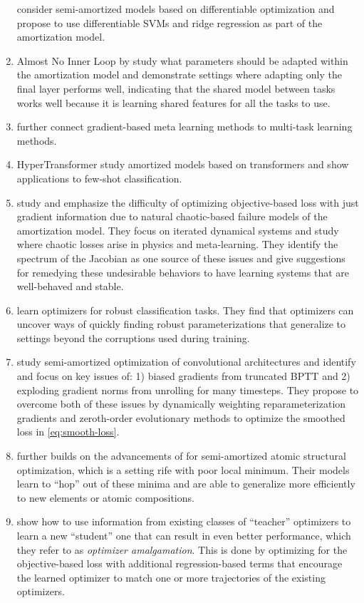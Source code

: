 \documentclass[twoside,11pt]{article}
\begin{document}
\begin{enumerate}
  consider semi-amortized models based on differentiable
  optimization and propose to use differentiable SVMs
  and ridge regression as part of the amortization model.
\item Almost No Inner Loop by \citet{raghu2019rapid}
  study what parameters should be adapted within the amortization
  model and demonstrate settings where adapting only
  the final layer performs well, indicating that the shared model
  between tasks works well because it is learning
  shared features for all the tasks to use.
\item \citet{wang2021bridging} further connect gradient-based meta
  learning methods to multi-task learning methods.
\item HyperTransformer \citep{zhmoginov2022hypertransformer}
  study amortized models based on transformers
  \citep{vaswani2017attention}
  and show applications to few-shot classification.
\item \citet{metz2021gradients} study and emphasize the difficulty
  of optimizing objective-based loss with just gradient
  information due to natural chaotic-based failure models
  of the amortization model.
  They focus on iterated dynamical systems and study where
  chaotic losses arise in physics and meta-learning.
  They identify the spectrum of the Jacobian as one
  source of these issues and give suggestions for
  remedying these undesirable behaviors to have learning
  systems that are well-behaved and stable.
\item \citet{metz2019using} learn optimizers for robust
  classification tasks. They find that optimizers can
  uncover ways of quickly finding robust parameterizations
  that generalize to settings beyond the corruptions
  used during training.
\item \citet{metz2019understanding} study semi-amortized
  optimization of convolutional architectures and identify
  and focus on key issues of:
  1) biased gradients from truncated BPTT and 2) exploding gradient
  norms from unrolling for many timesteps.
  They propose to overcome both of these issues by
  dynamically weighting reparameterization
  gradients and zeroth-order evolutionary methods to
  optimize the smoothed loss in \cref{eq:smooth-loss}.
\item \citet{merchant2021learn2hop} further builds on
  the advancements of \citet{metz2019understanding} for
  semi-amortized atomic structural optimization, which
  is a setting rife with poor local minimum.
  Their models learn to ``hop'' out of these minima
  and are able to generalize more efficiently to
  new elements or atomic compositions.
\item \citet{huang2022optimizer} show how to use
  information from existing classes of ``teacher''
  optimizers to learn a new ``student'' one that
  can result in even better performance,
  which they refer to as \emph{optimizer amalgamation}.
  This is done by optimizing for the objective-based
  loss with additional regression-based terms that
  encourage the learned optimizer to match one or
  more trajectories of the existing optimizers.
\end{enumerate}
\end{document}
